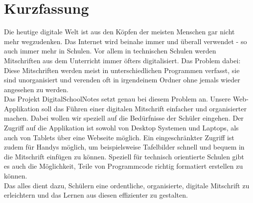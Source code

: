 \section*{Kurzfassung}

Die heutige digitale Welt ist aus den Köpfen der meisten Menschen gar nicht mehr wegzudenken. Das Internet wird beinahe immer und überall verwendet - so auch immer mehr in Schulen. Vor allem in technischen Schulen werden Mitschriften aus dem Unterricht immer öfters digitalisiert. Das Problem dabei: Diese Mitschriften werden meist in unterschiedlichen Programmen verfasst, sie sind unorganisiert und verenden oft in irgendeinem Ordner ohne jemals wieder angesehen zu werden.\\
Das Projekt DigitalSchoolNotes setzt genau bei diesem Problem an. Unsere Web-Applikation soll das Führen einer digitalen Mitschrift einfacher und organisierter machen. Dabei wollen wir speziell auf die Bedürfnisse der Schüler eingehen. Der Zugriff auf die Applikation ist sowohl von Desktop Systemen und Laptops, als auch von Tablets über eine Webseite möglich. Ein eingeschränkter Zugriff ist zudem für Handys möglich, um beispielsweise Tafelbilder schnell und bequem in die Mitschrift einfügen zu können. Speziell für technisch orientierte Schulen gibt es auch die Möglichkeit, Teile von Programmcode richtig formatiert erstellen zu können. \\
Das alles dient dazu, Schülern eine ordentliche, organisierte, digitale Mitschrift zu erleichtern und das Lernen aus diesen effizienter zu gestalten.